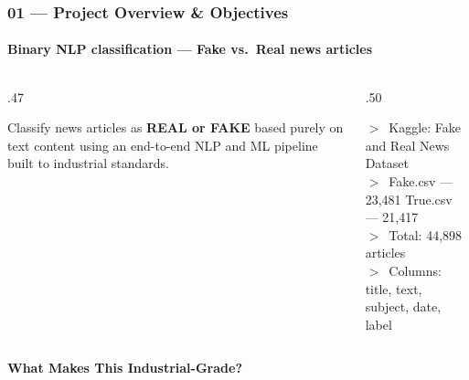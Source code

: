 \documentclass[aspectratio=169,10pt]{beamer}
\begin{document}
\begin{frame}[t]
\frametitle{01 --- Project Overview \& Objectives}
\framesubtitle{Binary NLP classification --- Fake vs.\ Real news articles}
\vspace{.1cm}
\begin{columns}[T]
\begin{column}{.47\textwidth}
\vspace{-15pt}
  \begin{tcolorbox}[mycard={ABlue}{ABlue},colback=BlueL,
      title={\textbf{Objective}},colbacktitle=ABlue,coltitle=white,fonttitle=\small\bfseries]
    \small Classify news articles as \textcolor{ARed}{\textbf{REAL or FAKE}} based purely on
    text content using an end-to-end NLP and ML pipeline built to industrial standards.
  \end{tcolorbox}
\end{column}
\begin{column}{.50\textwidth}
\vspace{-15pt}
    \begin{tcolorbox}[mycard={ATeal}{ATeal},colback=TealL,
      title={\textbf{Dataset}},colbacktitle=ATeal,coltitle=white,fonttitle=\small\bfseries]
    \scriptsize
    \textbf{$>$}\ Kaggle: Fake and Real News Dataset\\[2pt]
    \textbf{$>$}\ Fake.csv --- 23,481 \quad True.csv --- 21,417\\[2pt]
    \textbf{$>$}\ Total: 44,898 articles\\[2pt]
    \textbf{$>$}\ Columns: title, text, subject, date, label
  \end{tcolorbox}
\end{column}
\end{columns}
\vspace{.15cm}
{\small\textbf{What Makes This Industrial-Grade?}}


\end{frame}
\end{document}
